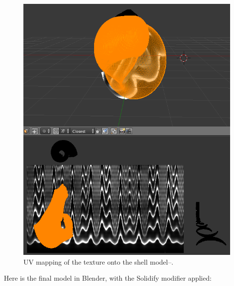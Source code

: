 \documentclass[a4paper]{article}
\begin{document}
\begin{figure}[h]
	\centering\includegraphics[scale=1.3]{./img/uv_map.png}
	\caption{UV mapping of the texture onto the shell model--.}
	\label{3d-printed-torus} %
\end{figure}

\pagebreak

Here is the final model in Blender, with the Solidify modifier applied:
\end{document}
